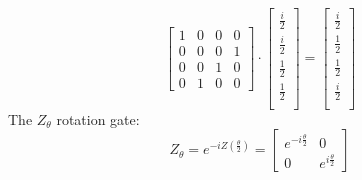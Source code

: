 \documentclass{article}
\begin{document}
\begin{itemize}
\begin{figure}[H]
	      \end{figure}
	      \[
		      \begin{bmatrix}
			      1 & 0 & 0 & 0 \\
			      0 & 0 & 0 & 1 \\
			      0 & 0 & 1 & 0 \\
			      0 & 1 & 0 & 0
		      \end{bmatrix}
		      \cdot
		      \begin{bmatrix}
			      \frac{i}{2} \\
			      \frac{i}{2} \\
			      \frac{1}{2} \\
			      \frac{1}{2} \\
		      \end{bmatrix}
		      =
		      \begin{bmatrix}
			      \frac{i}{2} \\
			      \frac{1}{2} \\
			      \frac{1}{2} \\
			      \frac{i}{2} \\
		      \end{bmatrix}
	      \]
	      The \(Z_\theta\) rotation gate:
	      \[
		      Z_\theta = e^{-iZ(\frac{\theta}{2})} =
		      \begin{bmatrix}
			      e^{-i \frac{\theta}{2}} & 0                      \\
			      0                       & e^{i \frac{\theta}{2}}
		      \end{bmatrix}
	      \]


\end{itemize}
\end{document}
